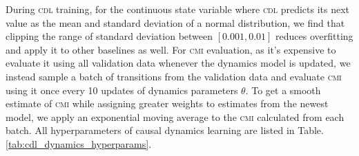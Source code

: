 During \textsc{cdl} training, for the continuous state variable where \textsc{cdl} predicts its next value as the mean and standard deviation of a normal distribution, we find that clipping the range of standard deviation between $[0.001, 0.01]$ reduces overfitting and apply it to other baselines as well. For \textsc{cmi} evaluation, as it's expensive to evaluate it using all validation data whenever the dynamics model is updated, we instead sample a batch of transitions from the validation data and evaluate \textsc{cmi} using it once every 10 updates of dynamics parameters $\theta$. To get a smooth estimate of \textsc{cmi} while assigning greater weights to estimates from the newest model, we apply an exponential moving average to the \textsc{cmi} calculated from each batch. All hyperparameters of causal dynamics learning are listed in Table. \ref{tab:cdl_dynamics_hyperparams}.

